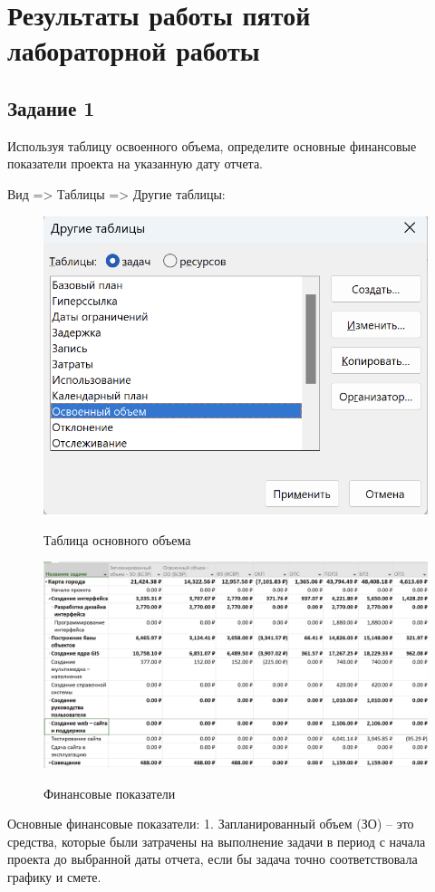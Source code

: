 \section{Результаты работы пятой лабораторной работы}

\subsection{Задание 1}

Используя таблицу освоенного объема, определите основные
финансовые показатели проекта на указанную дату отчета.

Вид => Таблицы => Другие таблицы:

\begin{figure}[ht!]
	\includegraphics[width=0.75\linewidth]{assets/images/volume.png}
	\label{fig:r2}
	\caption{Таблица основного объема}
\end{figure}
\FloatBarrier

\begin{figure}[ht!]
	\includegraphics[width=0.75\linewidth]{assets/images/new-gant.png}
	\label{fig:r2}
	\caption{Финансовые показатели}
\end{figure}
\FloatBarrier

Основные финансовые показатели:
1. Запланированный объем (ЗО) – это средства, которые были затрачены
на выполнение задачи в период с начала проекта до выбранной даты
отчета, если бы задача точно соответствовала графику и смете.

